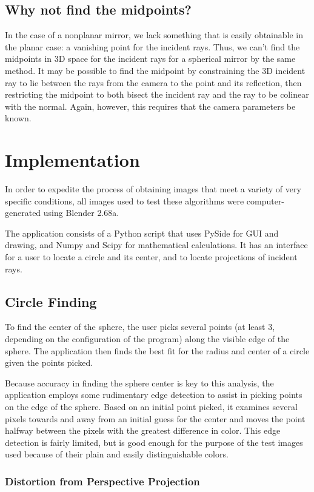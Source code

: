 \documentclass{thesis}
\begin{document}
\section{Why not find the midpoints?}
In the case of a nonplanar mirror, we lack something that is easily obtainable in the planar case: a vanishing point for the incident rays. Thus, we can't find the midpoints in 3D space for the incident rays for a spherical mirror by the same method. It may be possible to find the midpoint by constraining the 3D incident ray to lie between the rays from the camera to the point and its reflection, then restricting the midpoint to both bisect the incident ray and the ray to be colinear with the normal. Again, however, this requires that the camera parameters be known.

\chapter{Implementation}
In order to expedite the process of obtaining images that meet a variety of very specific conditions, all images used to test these algorithms were computer-generated using Blender 2.68a.

The application consists of a Python script that uses PySide for GUI and drawing, and Numpy and Scipy for mathematical calculations. It has an interface for a user to locate a circle and its center, and to locate projections of incident rays.

\section{Circle Finding}
To find the center of the sphere, the user picks several points (at least 3, depending on the configuration of the program) along the visible edge of the sphere. The application then finds the best fit for the radius and center of a circle given the points picked.

Because accuracy in finding the sphere center is key to this analysis, the application employs some rudimentary edge detection to assist in picking points on the edge of the sphere. Based on an initial point picked, it examines several pixels towards and away from an initial guess for the center and moves the point halfway between the pixels with the greatest difference in color. This edge detection is fairly limited, but is good enough for the purpose of the test images used because of their plain and easily distinguishable colors.

\subsection{Distortion from Perspective Projection}
\label{sec:perspective-distortion}
\end{document}
